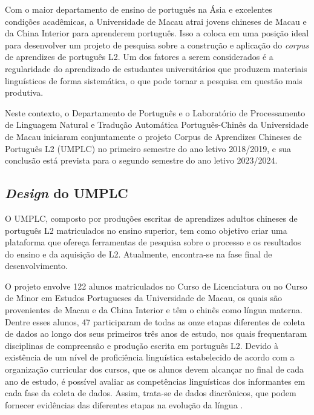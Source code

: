 \documentclass[portuguese]{textolivre}
\begin{document}
Com o maior departamento de ensino de português na Ásia e excelentes condições acadêmicas, a Universidade de Macau atrai jovens chineses de Macau e da China Interior para aprenderem português. Isso a coloca em uma posição ideal para desenvolver um projeto de pesquisa sobre a construção e aplicação do \textit{corpus} de aprendizes de português L2. Um dos fatores a serem considerados é a regularidade do aprendizado de estudantes universitários que produzem materiais linguísticos de forma sistemática, o que pode tornar a pesquisa em questão mais produtiva.

Neste contexto, o Departamento de Português e o Laboratório de Processamento de Linguagem Natural e Tradução Automática Português-Chinês da Universidade de Macau iniciaram conjuntamente o projeto Corpus de Aprendizes Chineses de Português L2 (UMPLC) no primeiro semestre do ano letivo 2018/2019, e sua conclusão está prevista para o segundo semestre do ano letivo 2023/2024. 


\subsection{\textit{Design} do UMPLC}
O UMPLC, composto por produções escritas de aprendizes adultos chineses de português L2 matriculados no ensino superior, tem como objetivo criar uma plataforma que ofereça ferramentas de pesquisa sobre o processo e os resultados do ensino e da aquisição de L2. Atualmente, encontra-se na fase final de desenvolvimento.

O projeto envolve 122 alunos matriculados no Curso de Licenciatura ou no Curso de Minor em Estudos Portugueses da Universidade de Macau, os quais são provenientes de Macau e da China Interior e têm o chinês como língua materna. Dentre esses alunos, 47 participaram de todas as onze etapas diferentes de coleta de dados ao longo dos seus primeiros três anos de estudo, nos quais frequentaram disciplinas de compreensão e produção escrita em português L2. Devido à existência de um nível de proficiência linguística estabelecido de acordo com a organização curricular dos cursos, que os alunos devem alcançar no final de cada ano de estudo, é possível avaliar as competências linguísticas dos informantes em cada fase da coleta de dados. Assim, trata-se de dados diacrônicos, que podem fornecer evidências das diferentes etapas na evolução da língua \cite{kubler2015corpus}.
\end{document}
